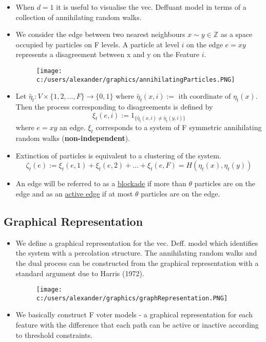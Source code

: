 \documentclass[
paper=128mm:96mm, %
fontsize=11pt, %
pagesize, %
parskip=half-, %
]{scrartcl} %
\theoremstyle{mythmstyle} %
\begin{document}
\begin{itemize}
\item When $d=1$ it is useful to visualise the vec. Deffuant model in terms of a collection of annihilating random walks.
\item We consider the edge between two nearest neighbours $x \sim y \in \mathbb{Z}$ as a space occupied by particles on F levels. A particle at level $i$ on the edge $e=xy$ represents a disagreement between x and y on the Feature $i$.
\begin{figure}[h]
\centering\texttt{[image: c:/users/alexander/graphics/annihilatingParticles.PNG]}
\caption{\cite{ClustCoex}}
\end{figure}
\item Let $\tilde{\eta_t}: V \times \{1,2,...,F\} \rightarrow \{0,1\} \text{ where } \tilde{\eta_t}(x,i) := \text{ ith coordinate of } \eta_t(x)$.
Then the process corresponding to disagreements is defined by 
$$\xi_t(e,i):= 1_{\{\tilde{\eta_t}(x,i) \neq \tilde{\eta_t}(y,i)\}}$$
where $e=xy$ an edge. $\xi_t$ corresponds to a system of F symmetric annihilating random walks (\textbf{non-independent}).
\item  Extinction of particles is equivalent to a clustering of the system.$$\zeta_t(e):=\xi_t(e,1)+\xi_t(e,2)+...+\xi_t(e,F)= H(\eta_t(x),\eta_t(y))$$
\item An edge will be referred to as a \underline{blockade} if more than $\theta$ particles are on the edge and as an \underline{active edge} if at most $\theta$ particles are on the edge.

\end{itemize}

\clearpage 

\subsection{Graphical Representation}
\begin{itemize}
\item We define a graphical representation for the vec. Deff. model which identifies the system with a percolation structure. The annihilating random walks and the dual process can be constructed from the graphical representation with a standard argument due to Harris (1972). \\

\begin{figure}[h]
\centering\texttt{[image: c:/users/alexander/graphics/graphRepresentation.PNG]}
\end{figure}

\clearpage

\item We basically construct F voter models - a graphical representation for each feature with the difference that each path can be active or inactive according to threshold constraints.
\end{itemize}
\end{document}
